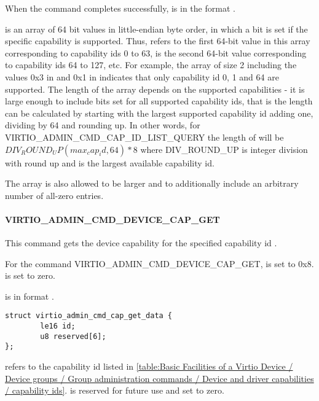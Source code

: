 When the command completes successfully, 
is in the format .

 is an array of 64 bit values in little-endian byte
order, in which a bit is set if the specific capability is supported.
Thus,  refers to the first 64-bit value in this
array corresponding to capability ids 0 to
63,  is the second 64-bit value corresponding to
capability ids 64 to 127, etc. For example, the array of size 2 including
the values 0x3 in  and 0x1 in
 indicates that only capability id 0, 1
and 64 are supported.
The length of the array depends on the supported capabilities - it is
large enough to include bits set for all supported capability ids,
that is the length can be calculated by starting with the largest
supported capability id adding one, dividing by 64 and rounding up.
In other words, for VIRTIO_ADMIN_CMD_CAP_ID_LIST_QUERY the length of
 will be
$DIV_ROUND_UP(max_cap_id, 64) * 8$ where DIV_ROUND_UP is integer division
with round up and  is the largest available capability id.

The array is also allowed to be larger and to additionally include an arbitrary
number of all-zero entries.

\paragraph{VIRTIO_ADMIN_CMD_DEVICE_CAP_GET}\label{par:Basic Facilities of a Virtio Device / Device groups / Group administration commands / Device and driver capabilities / VIRTIO-ADMIN-CMD-DEVICE-CAP-GET}

This command gets the device capability for the specified capability
id .

For the command VIRTIO_ADMIN_CMD_DEVICE_CAP_GET,  is set to 0x8.
 is set to zero.

 is in format
.

\begin{lstlisting}
struct virtio_admin_cmd_cap_get_data {
        le16 id;
        u8 reserved[6];
};
\end{lstlisting}

 refers to the capability id listed in \ref{table:Basic Facilities of a Virtio Device / Device groups / Group administration commands / Device and driver capabilities / capability ids}.
 is reserved for future use and set to zero.

